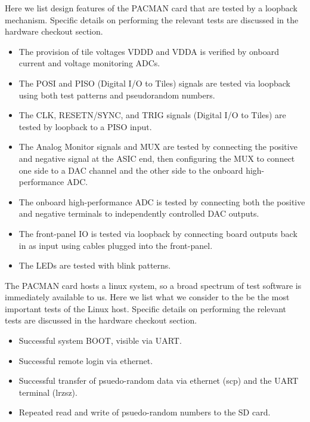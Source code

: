 \documentclass[12pt]{article}
\begin{document}
Here we list design features of the PACMAN card
that are tested by a loopback mechanism.  Specific details on
performing the relevant tests are discussed in the hardware checkout
section.
\begin{itemize}
\item The provision of tile voltages VDDD and VDDA is verified by
  onboard current and voltage monitoring ADCs.

\item The POSI and PISO (Digital I/O to Tiles) signals are tested via
  loopback using both test patterns and pseudorandom numbers.

\item The CLK, RESETN/SYNC, and TRIG signals (Digital I/O to Tiles)
  are tested by loopback to a PISO input.

\item The Analog Monitor signals and MUX are tested by connecting the
  positive and negative signal at the ASIC end, then configuring the
  MUX to connect one side to a DAC channel and the other side to the
  onboard high-performance ADC.

\item The onboard high-performance ADC is tested by connecting both
  the positive and negative terminals to independently controlled DAC
  outputs.

\item The front-panel IO is tested via loopback by connecting board
  outputs back in as input using cables plugged into the front-panel.

\item The LEDs are tested with blink patterns.

\end{itemize}

The PACMAN card hosts a linux system, so a broad spectrum of test
software is immediately available to us.  Here we list what we
consider to the be the most important tests of the Linux host.
Specific details on performing the relevant tests are discussed in the
hardware checkout section.

\begin{itemize}
\item Successful system BOOT, visible via UART.
\item Successful remote login via ethernet.
\item Successful transfer of psuedo-random data via ethernet (scp) and the UART terminal (lrzsz).
\item Repeated read and write of psuedo-random numbers to the SD card.
\end{itemize}
\end{document}
